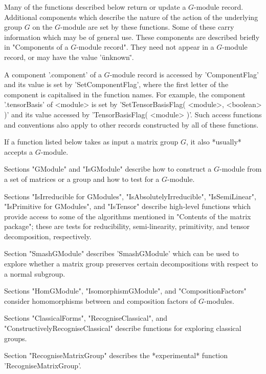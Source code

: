 Many of the  functions  described  below  return or update   a $G$-module
record.  Additional components which describe the nature of the action of
the underlying group  $G$ on the $G$-module are  set  by these functions.
Some of  these  carry information which may   be  of general  use.  These
components are described briefly  in "Components of a $G$-module record".
They need not  appear in  a $G$-module record,    or may have the   value
'\"unknown\"'.

A   component  '.component'  of  a  $G$-module   record is   accessed  by
'ComponentFlag'  and its value   is set by  'SetComponentFlag', where the
first letter  of the component is  capitalised in the function names. For
example, the  component     '.tensorBasis'  of   <module>   is  set    by
'SetTensorBasisFlag( <module>,  <boolean>  )' and its  value  accessed by
'TensorBasisFlag( <module>  )'.  Such  access functions  and  conventions
also apply to other records constructed by all of these functions.

If a  function listed below takes as  input a matrix   group $G$, it also
*usually* accepts a $G$-module.


Sections "GModule" and "IsGModule" describe how to construct a $G$-module
from a set of matrices or a group and how to test for a $G$-module.

Sections    "IsIrreducible for GModules",   "IsAbsolutelyIrreducible",
"IsSemiLinear",  "IsPrimitive for GModules", and   "IsTensor"  describe  high-level
functions which provide access to some  of the algorithms mentioned in
"Contents  of the matrix  package"; these  are tests for reducibility,
semi-linearity, primitivity, and tensor decomposition, respectively.

Section "SmashGModule"  describes  'SmashGModule' which  can be  used  to
explore  whether  a matrix  group  preserves  certain decompositions with
respect to a normal subgroup.

Sections "HomGModule", "IsomorphismGModule",  and    "CompositionFactors"
consider homomorphisms between and composition factors of $G$-modules.

Sections        "ClassicalForms",        "RecogniseClassical",        and
"ConstructivelyRecogniseClassical"   describe functions for     exploring
classical groups.

Section  "RecogniseMatrixGroup"  describes  the *experimental*   function
'RecogniseMatrixGroup'.

